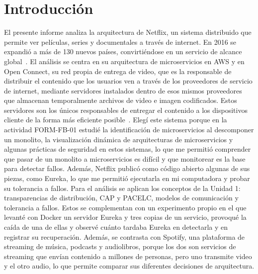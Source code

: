 \section{Introducción}
El presente informe analiza la arquitectura de Netflix, un sistema distribuido que permite ver películas, series y documentales a través de internet. En 2016 se expandió a más de 130 nuevos países, convirtiéndose en un servicio de alcance global~\cite{Netflix_CloudMigration}. El análisis se centra en su arquitectura de microservicios en AWS y en Open Connect, su red propia de entrega de video, que es la responsable de distribuir el contenido que los usuarios ven a través de los proveedores de servicio de internet, mediante servidores instalados dentro de esos mismos proveedores que almacenan temporalmente archivos de video e imagen codificados. Estos servidores son los únicos responsables de entregar el contenido a los dispositivos cliente de la forma más eficiente posible~\cite{Netflix_OpenConnect}.
Elegí este sistema porque en la actividad FORM-FB-01 estudié la identificación de microservicios al descomponer un monolito, la visualización dinámica de arquitecturas de microservicios y algunas prácticas de seguridad en estos sistemas, lo que me permitió comprender que pasar de un monolito a microservicios es difícil y que monitorear es la base para detectar fallos. Además, Netflix publicó como código abierto algunas de sus piezas, como Eureka, lo que me permitió ejecutarla en mi computadora y probar su tolerancia a fallos.
Para el análisis se aplican los conceptos de la Unidad 1: transparencias de distribución, CAP y PACELC, modelos de comunicación y tolerancia a fallos. Estos se complementan con un experimento propio en el que levanté con Docker un servidor Eureka y tres copias de un servicio, provoqué la caída de una de ellas y observé cuánto tardaba Eureka en detectarla y en registrar su recuperación. Además, se contrasta con Spotify, una plataforma de streaming de música, podcasts y audiolibros, porque los dos son servicios de streaming que envían contenido a millones de personas, pero uno transmite video y el otro audio, lo que permite comparar sus diferentes decisiones de arquitectura.
